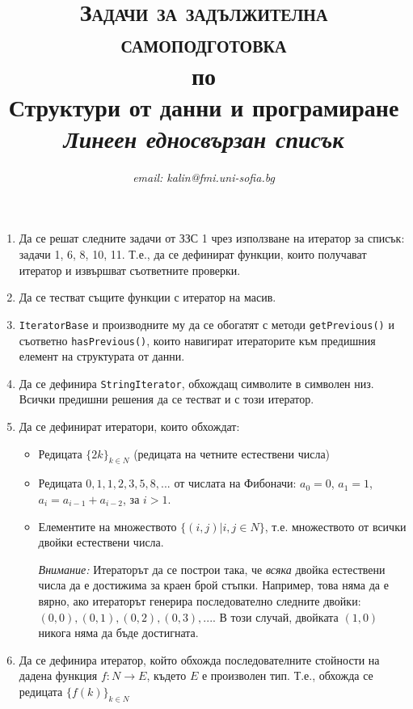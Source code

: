 \documentclass[12pt,a4paper]{article}
\author{\textit{email: kalin@fmi.uni-sofia.bg}}
\title{\textsc{Задачи за задължителна самоподготовка} \\
по \\
Структури от данни и програмиране\\
\textit{Линеен едносвързан списък}}
\newcommand{\code}[1]{\texttt{#1}}
\begin{document}
\maketitle


\begin{enumerate}

	\item  Да се решат следните задачи от ЗЗС 1 чрез използване на итератор за списък: задачи 1, 6, 8, 10, 11. Т.е., да се дефинират функции, които получават итератор и извършват съответните проверки.
	\item Да се тестват същите функции с итератор на масив.

	\item \code{IteratorBase} и производните му да се обогатят с методи \code{getPrevious()} и съответно \code{hasPrevious()}, които навигират итераторите към предишния елемент на структурата от данни.

	\item Да се дефинира \code{StringIterator}, обхождащ символите в символен низ. Всички предишни решения да се тестват и с този итератор.

	\item Да се дефинират итератори, които обхождат:
		\begin{itemize}
			\item Редицата $\{2k\}_{k \in N}$ (редицата на четните естествени числа)
			\item Редицата $0,1,1,2,3,5,8,...$ от числата на Фибоначи: $a_0 = 0$, $a_1 = 1$, $a_i=a_{i-1}+a_{i-2}$, за $i>1$.
			\item Елементите на множеството $\{(i,j)|i,j \in N\}$, т.е. множеството от всички двойки естествени числа.

			\emph{Внимание:} Итераторът да се построи така, че \emph{всяка} двойка естествени числа да е достижима за краен брой стъпки. Например, това няма да е вярно, ако итераторът генерира последователно следните двойки: $(0,0), (0,1), (0,2), (0,3), ...$. В този случай, двойката $(1,0)$ никога няма да бъде достигната.
		\end{itemize}

		\item Да се дефинира итератор, който обхожда последователните стойности на дадена функция $f:N \rightarrow E$, където $E$ е произволен тип. Т.е., обхожда се редицата $\{f(k)\}_{k \in N	}$



\end{enumerate}


	\vspace{20px}
\end{document}
